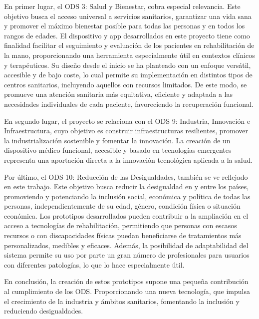 En primer lugar, el ODS 3: Salud y Bienestar, cobra especial relevancia. Este objetivo busca el acceso universal a servicios sanitarios, garantizar una vida sana y promover el máximo bienestar posible para todas las personas y en todos los rangos de edades. El dispositivo y app desarrollados en este proyecto tiene como finalidad facilitar el seguimiento y evaluación de los pacientes en rehabilitación de la mano, proporcionando una herramienta especialmente útil en contextos clínicos y terapéuticos. Su diseño desde el inicio se ha planteado con un enfoque versátil, accesible y de bajo coste, lo cual permite su implementación en distintos tipos de centros sanitarios, incluyendo aquellos con recursos limitados. De este modo, se promueve una atención sanitaria más equitativa, eficiente y adaptada a las necesidades individuales de cada paciente, favoreciendo la recuperación funcional.\cite{salud_ODS}

En segundo lugar, el proyecto se relaciona con el ODS 9: Industria, Innovación e Infraestructura, cuyo objetivo es construir infraestructuras resilientes, promover la industrialización sostenible y fomentar la innovación. La creación de un dispositivo médico funcional, accesible y basado en tecnologías emergentes representa una aportación directa a la innovación tecnológica aplicada a la salud. \cite{infraestructura_ODS}

Por último, el ODS 10: Reducción de las Desigualdades, también se ve reflejado en este trabajo. Este objetivo busca reducir la desigualdad en y entre los países, promoviendo y potenciando la inclusión social, económica y política de todas las personas, independientemente de su edad, género, condición física o situación económica. Los prototipos desarrollados pueden contribuir a la ampliación en el acceso a tecnologías de rehabilitación, permitiendo que personas con escasos recursos o con discapacidades físicas puedan beneficiarse de tratamientos más personalizados, medibles y eficaces. Además, la posibilidad de adaptabilidad del sistema permite su uso por parte un gran número de profesionales para usuarios con diferentes patologías, lo que lo hace especialmente útil.\cite{desigualdades_ODS}

En conclusión, la creación de estos prototipos supone una pequeña contribución al cumplimiento de los ODS. Proporcionando una nueva tecnología, que impulsa el crecimiento de la industria y ámbitos sanitarios, fomentando la inclusión y reduciendo desigualdades.